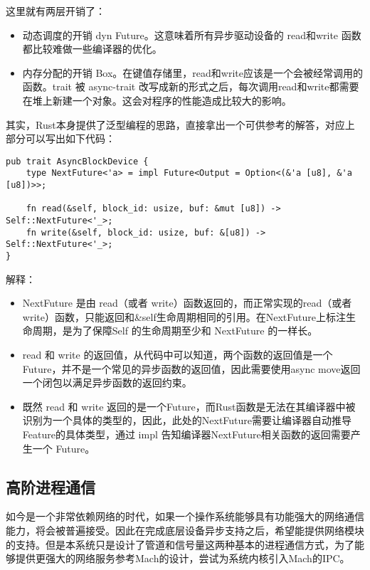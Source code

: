 这里就有两层开销了：

\begin{itemize}
    \item 动态调度的开销 dyn Future。这意味着所有异步驱动设备的 read和write 函数都比较难做一些编译器的优化。
    \item 内存分配的开销 Box。在键值存储里，read和write应该是一个会被经常调用的函数。trait 被 async-trait 改写成新的形式之后，每次调用read和write都需要在堆上新建一个对象。这会对程序的性能造成比较大的影响。
\end{itemize}
其实，Rust本身提供了泛型编程的思路，直接拿出一个可供参考的解答，对应上部分可以写出如下代码：


\begin{lstlisting}[caption = AsyncBlockDevice的泛型异步接口]
pub trait AsyncBlockDevice {
    type NextFuture<'a> = impl Future<Output = Option<(&'a [u8], &'a [u8])>>;

    fn read(&self, block_id: usize, buf: &mut [u8]) -> Self::NextFuture<'_>;
    fn write(&self, block_id: usize, buf: &[u8]) -> Self::NextFuture<'_>;
}
\end{lstlisting}


解释：

\begin{itemize}
    \item NextFuture 是由 read（或者 write）函数返回的，而正常实现的read（或者 write）函数，只能返回和\&self生命周期相同的引用。在NextFuture上标注生命周期，是为了保障Self 的生命周期至少和 NextFuture 的一样长。
    \item read 和 write 的返回值，从代码中可以知道，两个函数的返回值是一个 Future，并不是一个常见的异步函数的返回值，因此需要使用async move返回一个闭包以满足异步函数的返回约束。
    \item 既然 read 和 write 返回的是一个Future，而Rust函数是无法在其编译器中被识别为一个具体的类型的，因此，此处的NextFuture需要让编译器自动推导Feature的具体类型，通过 impl 告知编译器NextFuture相关函数的返回需要产生一个	Future。
\end{itemize}

\subsection{高阶进程通信}

如今是一个非常依赖网络的时代，如果一个操作系统能够具有功能强大的网络通信能力，将会被普遍接受。因此在完成底层设备异步支持之后，希望能提供网络模块的支持。但是本系统只是设计了管道和信号量这两种基本的进程通信方式，为了能够提供更强大的网络服务参考Mach的设计，尝试为系统内核引入Mach的IPC。

